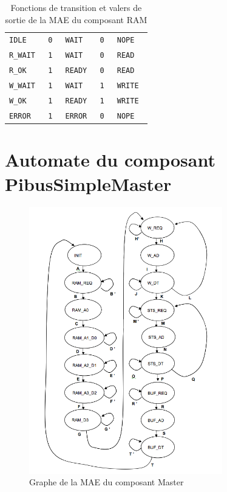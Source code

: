 \documentclass{article}
\begin{document}
\begin{table}[H]
\begin{tabular}{| l | l | l | l | l |}
\hline
\tt{IDLE}           & \tt{0}            & \tt{WAIT}         & \tt{0}      & \tt{NOPE}         \\
\tt{R\_WAIT}        & \tt{1}            & \tt{WAIT}         & \tt{0}      & \tt{READ}         \\
\tt{R\_OK}          & \tt{1}            & \tt{READY}        & \tt{0}      & \tt{READ}         \\
\tt{W\_WAIT}        & \tt{1}            & \tt{WAIT}         & \tt{1}      & \tt{WRITE}        \\
\tt{W\_OK}          & \tt{1}            & \tt{READY}        & \tt{1}      & \tt{WRITE}        \\
\tt{ERROR}          & \tt{1}            & \tt{ERROR}        & \tt{0}      & \tt{NOPE}         \\
\hline
\end{tabular}
\endgroup
\caption{Fonctions de transition et valers de sortie de la MAE du composant RAM}
\label{standard}
\end{table}



\section{Automate du composant PibusSimpleMaster}

\begin{figure}[H]
\includegraphics[width=0.75\textwidth]{pics/mae_master.png}
\centering
\caption{Graphe de la MAE du composant Master}
\label{mae_ram}
\end{figure}
\end{document}
